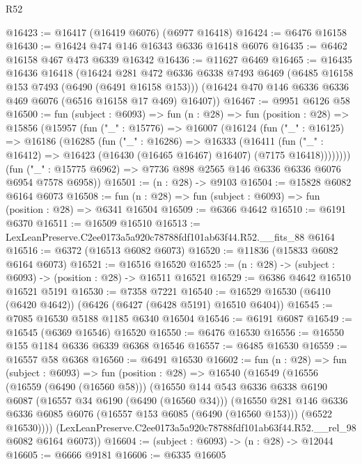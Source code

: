 \begin{lexlean}{R52}
\begin{coremodule}
@16423 := @16417 (@16419 @6076) (@6977 @16418)
@16424 := @6476 @16158
@16430 := @16424 @474 @146 @16343 @6336 @16418 @6076
@16435 := @6462 @16158 @467 @473 @6339 @16342
@16436 := @11627 @6469
@16465 := @16435
    @16436
    @16418
    (@16424
      @281
      @472
      @6336
      @6338
      @7493
      @6469
      (@6485 @16158 @153 @7493 (@6490 (@6491 @16158 @153)))
      (@16424 @470 @146 @6336 @6336 @469 @6076 (@6516 @16158 @17 @469) @16407))
@16467 := @9951 @6126 @58
@16500 := fun (subject : @6093) =>
  fun (n : @28) =>
  fun (position : @28) =>
  @15856
    (@15957
      (fun ("_" : @15776) =>
      @16007
        (@16124
          (fun ("_" : @16125) =>
          @16186
            (@16285
              (fun ("_" : @16286) =>
              @16333
                (@16411
                  (fun ("_" : @16412) =>
                  @16423 (@16430 (@16465 @16467) @16407) (@7175 @16418))))))))
      (fun ("_" : @15775 @6962) => @7736 @898 @2565 @146 @6336 @6336 @6076 @6954 @7578 @6958))
@16501 := (n : @28) -> @9103
@16504 := @15828 @6082 @6164 @6073
@16508 := fun (n : @28) => fun (subject : @6093) => fun (position : @28) => @6341 @16504
@16509 := @6366 @4642
@16510 := @6191 @6370
@16511 := @16509 @16510
@16513 := LexLeanPreserve.C2ee0173a5a920c78788fdf101ab63f44.R52.__fits_88 @6164
@16516 := @6372 (@16513 @6082 @6073)
@16520 := @11836 (@15833 @6082 @6164 @6073)
@16521 := @16516 @16520
@16525 := (n : @28) -> (subject : @6093) -> (position : @28) -> @16511 @16521
@16529 := @6386 @4642 @16510 @16521 @5191
@16530 := @7358 @7221
@16540 := @16529 @16530 (@6410 (@6420 @4642)) (@6426 (@6427 (@6428 @5191) @16510 @6404))
@16545 := @7085 @16530 @5188 @1185 @6340 @16504
@16546 := @6191 @6087
@16549 := @16545 (@6369 @16546) @16520
@16550 := @6476 @16530
@16556 := @16550 @155 @1184 @6336 @6339 @6368 @16546
@16557 := @6485 @16530
@16559 := @16557 @58 @6368
@16560 := @6491 @16530
@16602 := fun (n : @28) =>
  fun (subject : @6093) =>
  fun (position : @28) =>
  @16540
    (@16549
      (@16556
        (@16559 (@6490 (@16560 @58)))
        (@16550
          @144
          @543
          @6336
          @6338
          @6190
          @6087
          (@16557 @34 @6190 (@6490 (@16560 @34)))
          (@16550
            @281
            @146
            @6336
            @6336
            @6085
            @6076
            (@16557 @153 @6085 (@6490 (@16560 @153)))
            (@6522 @16530))))
      (LexLeanPreserve.C2ee0173a5a920c78788fdf101ab63f44.R52.__rel_98 @6082 @6164 @6073))
@16604 := (subject : @6093) -> (n : @28) -> @12044
@16605 := @6666 @9181
@16606 := @6335 @16605

\end{coremodule}
\end{lexlean}
